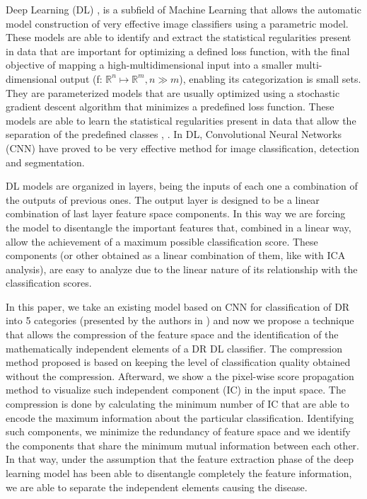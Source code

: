 \documentclass[review]{elsarticle}
\theoremstyle{definition} %
\theoremstyle{remark}
\begin{document}
Deep Learning (DL) \cite{nature-deep-learning}, \cite{Schmidhuber-nn} is a subfield of Machine Learning that allows the automatic model construction of very effective image classifiers using a parametric model. These models are able to identify and extract the statistical regularities present in data that are important for optimizing a defined loss function, with the final objective of mapping a high-multidimensional input into a smaller multi-dimensional output (f: $\mathbb{R}^{n} \mapsto \mathbb{R}^{m}, n \gg m$), enabling its categorization is small sets. They are parameterized models that are usually optimized using a stochastic gradient descent algorithm that minimizes a predefined loss function. These models are able to learn the statistical regularities present in data that allow the separation of the predefined classes \cite{Bengio:2013:RLR:2498740.2498889}, \cite{bengio-2009}. In DL, Convolutional Neural Networks (CNN) have proved to be very effective method for image classification, detection and segmentation. 

	DL models are organized in layers, being the inputs of each one a combination of the outputs of previous ones. The output layer is designed to be a linear combination of last layer feature space components. In this way we are forcing the model to disentangle the important features that, combined in a linear way, allow the achievement of a maximum possible classification score. These components (or other obtained as a linear combination of them, like with ICA analysis), are easy to analyze due to the linear nature of its relationship with the classification scores.

In this paper, we take an existing model based on CNN for classification of DR into 5 categories (presented by the authors in \cite{de2017deep}) and now
we propose a technique that allows the compression of the feature space and the identification of the mathematically independent elements of a DR DL classifier. The compression method proposed is based on keeping the level of classification quality obtained without the compression. Afterward, we show a the pixel-wise score propagation method to visualize such independent component (IC) in the input space. The compression is done by calculating the minimum number of IC that are able to encode the maximum information about the particular classification. Identifying such components, we minimize the redundancy of feature space and we identify the components that share the minimum mutual information between each other. In that way, under the assumption that the feature extraction phase of the deep learning model has been able to disentangle completely the feature information, we are able to separate the independent elements causing the disease.
\end{document}
